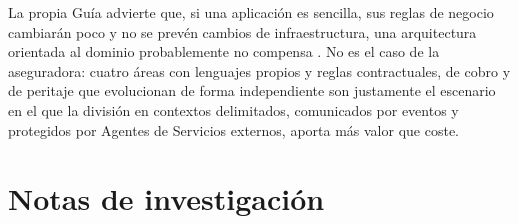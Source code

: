 La propia Guía advierte que, si una aplicación es sencilla, sus reglas de negocio
cambiarán poco y no se prevén cambios de infraestructura, una arquitectura orientada al
dominio probablemente no compensa \parencite[42]{delatorre2010}. No es el caso de la
aseguradora: cuatro áreas con lenguajes propios y reglas contractuales, de cobro y de
peritaje que evolucionan de forma independiente son justamente el escenario en el que la
división en contextos delimitados, comunicados por eventos y protegidos por Agentes de
Servicios externos, aporta más valor que coste.



\section*{Notas de investigación}

\endgroup
